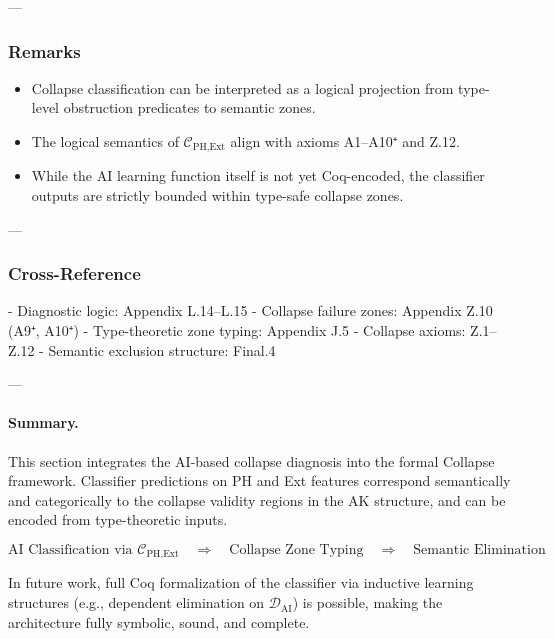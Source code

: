 \documentclass[11pt]{article}
\begin{document}
\begin{axiom}
\begin{axiom}
{{---

\subsubsection*{Remarks}

\begin{itemize}
  \item Collapse classification can be interpreted as a logical projection from  
        type-level obstruction predicates to semantic zones.
  \item The logical semantics of \( \mathcal{C}_{\text{PH,Ext}} \) align with axioms A1–A10⁺ and Z.12.
  \item While the AI learning function itself is not yet Coq-encoded,  
        the classifier outputs are strictly bounded within type-safe collapse zones.
\end{itemize}

---

\subsubsection*{Cross-Reference}

- Diagnostic logic: Appendix L.14–L.15  
- Collapse failure zones: Appendix Z.10 (A9⁺, A10⁺)  
- Type-theoretic zone typing: Appendix J.5  
- Collapse axioms: Z.1–Z.12  
- Semantic exclusion structure: Final.4

---

\paragraph{Summary.}

This section integrates the AI-based collapse diagnosis into the formal Collapse framework.  
Classifier predictions on PH and Ext features correspond semantically and categorically  
to the collapse validity regions in the AK structure, and can be encoded from  
type-theoretic inputs.

\[
\boxed{
\text{AI Classification via } \mathcal{C}_{\text{PH,Ext}} \quad
\Rightarrow \quad \text{Collapse Zone Typing} \quad
\Rightarrow \quad \text{Semantic Elimination}
}
\]

In future work, full Coq formalization of the classifier via inductive learning structures  
(e.g., dependent elimination on \( \mathcal{D}_{\text{AI}} \)) is possible, making the architecture  
fully symbolic, sound, and complete.




}}
\end{axiom}
\end{axiom}
\end{document}
